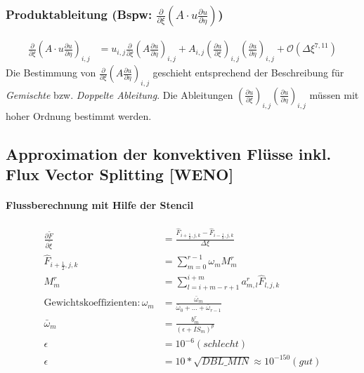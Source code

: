 \subsubsection{Produktableitung (Bspw: $\frac{\partial}{\partial \xi} \left(A \cdot u\frac{\partial u}{ \partial \eta}\right)$)}
\begin{align*}
\frac{\partial}{\partial \xi} \left(A \cdot u\frac{\partial u}{ \partial \eta}\right)_{i,j}&=
u_{i,j} \frac{\partial }{ \partial \xi} \left( A \frac{\partial u }{ \partial \eta} \right)_{i,j}+
A_{i,j} \left( \frac{\partial u}{\partial \xi} \right)_{i,j} \left( \frac{\partial u}{ \partial \eta} \right)_{i,j}
+\mathcal O\left(\varDelta \xi^{7,11}\right)
\end{align*}
Die Bestimmung von $\frac{\partial }{ \partial \xi} \left( A \frac{\partial u }{ \partial \eta} \right)_{i,j}$ geschieht entsprechend der Beschreibung für \textit{Gemischte} bzw. \textit{Doppelte Ableitung}.
Die Ableitungen $\left( \frac{\partial u}{\partial \xi} \right)_{i,j} \left( \frac{\partial u}{ \partial \eta} \right)_{i,j}$ müssen mit hoher Ordnung bestimmt werden.

\newpage

\subsection{Approximation der konvektiven Flüsse inkl. Flux Vector Splitting [WENO]}
 \paragraph*{Flussberechnung mit Hilfe der Stencil}
\begin{align*}
\frac{\partial \tilde{F}}{\partial \tilde{\xi}}&=
\frac{\hat{F}_{i+\frac{1}{2},j,k} -\hat{F}_{i-\frac{1}{2},j,k}}{\varDelta \xi}
\\
\hat{F}_{i+\frac{1}{2},j,k}&=\sum_{m=0}^{r-1} \omega_m M^r_m
\\
M^r_m&=\sum_{l=i+m-r+1}^{i+m} a^r_{m,l} \hat{F}_{l,j,k}
\\
\text{Gewichtskoeffizienten}:
\omega_m &=\frac{\bar{\omega}_m}{\bar{\omega}_0+...+\bar{\omega}_{r-1}}
\\
\bar{\omega}_m&=\frac{b_m^r}{\left(\epsilon+IS_m\right)^p}
\\
\epsilon &= 10^{-6} (schlecht)
\\
\epsilon &= 10*\sqrt{DBL\_ MIN}\approx 10^{-150} (gut)
\end{align*}
